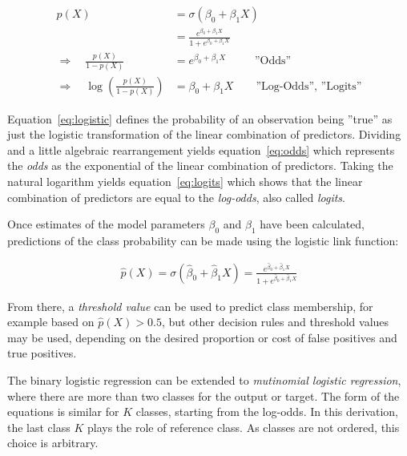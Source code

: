 \begin{align}
p(X) &= \sigma( \beta_0 + \beta_1 X) \nonumber \\ 
     &= \frac{e^{\beta_0 + \beta_1 X}}{1 + e^{\beta_0 + \beta_1 X}} \label{eq:logistic} \\
\Rightarrow \quad \frac{p(X)}{1 - p(X)} &= e^{\beta_0 + \beta_1 X} \qquad\;\; \text{''Odds''} \label{eq:odds} \\
\Rightarrow \quad \log \left( \frac{p(X)}{1 - p(X)} \right) &= \beta_0 + \beta_1 X \qquad \text{''Log-Odds'', ''Logits''} \label{eq:logits}
\end{align}

Equation~\ref{eq:logistic} defines the probability of an observation being ''true'' as just the logistic transformation of the linear combination of predictors. Dividing and a little algebraic rearrangement yields equation~\ref{eq:odds} which represents the \emph{odds} as the exponential of the linear combination of predictors. Taking the natural logarithm yields equation~\ref{eq:logits} which shows that the linear combination of predictors are equal to the \emph{log-odds}, also called \emph{logits}.

Once estimates of the model parameters $\beta_0$ and $\beta_1$ have been calculated, predictions of the class probability can be made using the logistic link function:

\begin{align*}
  \hat{p}(X) = \sigma(\hat{\beta}_0 + \hat{\beta}_1 X) = \frac{e^{\hat{\beta}_0 + \hat{\beta}_1 X}}{1 + e^{\hat{\beta}_0 + \hat{\beta}_1 X}}
\end{align*}

From there, a \emph{threshold value} can be used to predict class membership, for example based on $\hat{p}(X) > 0.5$, but other decision rules and threshold values may be used, depending on the desired proportion or cost of false positives and true positives.

The binary logistic regression can be extended to \emph{mutinomial logistic regression}, where there are more than two classes for the output or target. The form of the equations is similar for $K$ classes, starting from the log-odds. In this derivation, the last class $K$ plays the role of reference class. As classes are not ordered, this choice is arbitrary.

